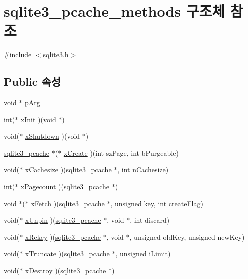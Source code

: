 \hypertarget{structsqlite3__pcache__methods}{}\section{sqlite3\+\_\+pcache\+\_\+methods 구조체 참조}
\label{structsqlite3__pcache__methods}


{\ttfamily \#include $<$sqlite3.\+h$>$}

\subsection*{Public 속성}
\begin{DoxyCompactItemize}
\item 
void $\ast$ \hyperlink{structsqlite3__pcache__methods_ac71a23fce5a94ac9bc6babdbbaf1b5b4}{p\+Arg}
\item 
int($\ast$ \hyperlink{structsqlite3__pcache__methods_ac75d3dbf840e6f05ea08d35ad0457fb2}{x\+Init} )(void $\ast$)
\item 
void($\ast$ \hyperlink{structsqlite3__pcache__methods_aa2835c25fac454b7ee7cfd9e625700d7}{x\+Shutdown} )(void $\ast$)
\item 
\hyperlink{sqlite3_8h_a096c453d937d51f7926d7d31c8e0bd2f}{sqlite3\+\_\+pcache} $\ast$($\ast$ \hyperlink{structsqlite3__pcache__methods_ac903d0438a7a1554c818b4c17585e790}{x\+Create} )(int sz\+Page, int b\+Purgeable)
\item 
void($\ast$ \hyperlink{structsqlite3__pcache__methods_ac9ccbed1bea2a902906bfeaa6a330b40}{x\+Cachesize} )(\hyperlink{sqlite3_8h_a096c453d937d51f7926d7d31c8e0bd2f}{sqlite3\+\_\+pcache} $\ast$, int n\+Cachesize)
\item 
int($\ast$ \hyperlink{structsqlite3__pcache__methods_a1e0895008a701c1843336f0e0dcd3f46}{x\+Pagecount} )(\hyperlink{sqlite3_8h_a096c453d937d51f7926d7d31c8e0bd2f}{sqlite3\+\_\+pcache} $\ast$)
\item 
void $\ast$($\ast$ \hyperlink{structsqlite3__pcache__methods_ae09b8ed29c2dd77157f26a69255fd482}{x\+Fetch} )(\hyperlink{sqlite3_8h_a096c453d937d51f7926d7d31c8e0bd2f}{sqlite3\+\_\+pcache} $\ast$, unsigned key, int create\+Flag)
\item 
void($\ast$ \hyperlink{structsqlite3__pcache__methods_a2aa1aefc301a0fe4998ed8397b028630}{x\+Unpin} )(\hyperlink{sqlite3_8h_a096c453d937d51f7926d7d31c8e0bd2f}{sqlite3\+\_\+pcache} $\ast$, void $\ast$, int discard)
\item 
void($\ast$ \hyperlink{structsqlite3__pcache__methods_a0d8a7a980e22e908429a181f8fc7733e}{x\+Rekey} )(\hyperlink{sqlite3_8h_a096c453d937d51f7926d7d31c8e0bd2f}{sqlite3\+\_\+pcache} $\ast$, void $\ast$, unsigned old\+Key, unsigned new\+Key)
\item 
void($\ast$ \hyperlink{structsqlite3__pcache__methods_adc097defb1e83c6442fc0d47ac79cec9}{x\+Truncate} )(\hyperlink{sqlite3_8h_a096c453d937d51f7926d7d31c8e0bd2f}{sqlite3\+\_\+pcache} $\ast$, unsigned i\+Limit)
\item 
void($\ast$ \hyperlink{structsqlite3__pcache__methods_ac775533f86db1d15bf7e4ded0e037eaf}{x\+Destroy} )(\hyperlink{sqlite3_8h_a096c453d937d51f7926d7d31c8e0bd2f}{sqlite3\+\_\+pcache} $\ast$)
\end{DoxyCompactItemize}


